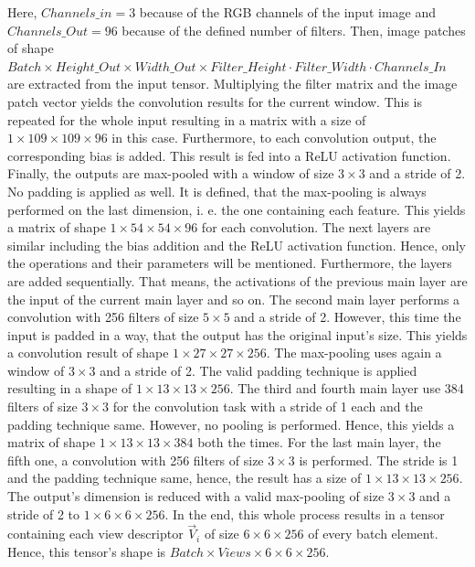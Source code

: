 Here, $Channels\_in = 3$ because of the RGB channels of the input image and $Channels\_Out = 96$ because of the defined number of filters.
Then, image patches of shape $Batch \times Height\_Out \times Width\_Out \times Filter\_Height \cdot Filter\_Width \cdot Channels\_In$ are extracted from the input tensor.
Multiplying the filter matrix and the image patch vector yields the convolution results for the current window.
This is repeated for the whole input resulting in a matrix with a size of $1 \times 109 \times 109 \times 96$ in this case.
Furthermore, to each convolution output, the corresponding bias is added.
This result is fed into a ReLU activation function.
Finally, the outputs are max-pooled with a window of size $3 \times 3$ and a stride of 2.
No padding is applied as well.
It is defined, that the max-pooling is always performed on the last dimension, i. e. the one containing each feature.
This yields a matrix of shape $1 \times 54 \times 54 \times 96$ for each convolution.
The next layers are similar including the bias addition and the ReLU activation function.
Hence, only the operations and their parameters will be mentioned.
Furthermore, the layers are added sequentially.
That means, the activations of the previous main layer are the input of the current main layer and so on.
The second main layer performs a convolution with 256 filters of size $5 \times 5$ and a stride of 2.
However, this time the input is padded in a way, that the output has the original input's size.
This yields a convolution result of shape $1 \times 27 \times 27 \times 256$.
The max-pooling uses again a window of $3 \times 3$ and a stride of 2.
The valid padding technique is applied resulting in a shape of $1 \times 13 \times 13 \times 256$.
The third and fourth main layer use 384 filters of size $3 \times 3$ for the convolution task with a stride of 1 each and the padding technique same.
However, no pooling is performed.
Hence, this yields a matrix of shape $1 \times 13 \times 13 \times 384$ both the times.
For the last main layer, the fifth one, a convolution with 256 filters of size $3 \times 3$ is performed.
The stride is 1 and the padding technique same, hence, the result has a size of $1 \times 13 \times 13 \times 256$.
The output's dimension is reduced with a valid max-pooling of size $3 \times 3$ and a stride of 2 to $1 \times 6 \times 6 \times 256$.
In the end, this whole process results in a tensor containing each view descriptor $\vec{V}_i$ of size $6 \times 6 \times 256$ of every batch element.
Hence, this tensor's shape is $Batch \times Views \times 6 \times 6 \times 256$.
